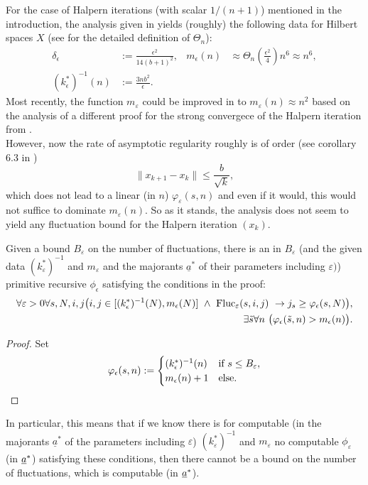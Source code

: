 For the case of Halpern iterations (with scalar $1/(n+1)$) mentioned in 
the introduction, the analysis given in \cite{Kohlenbach/Leustean6}   
yields (roughly) the following data for Hilbert spaces $X$ 
(see \cite{Kohlenbach/Leustean6} for the 
detailed definition of $\Theta_n$):
\begin{align*}
\delta_\epsilon &:= \frac{\epsilon^2}{14(b+1)^2},& m_\epsilon(n)&\approx \Theta_n(\frac{\epsilon^2}{4})n^6\approx n^6,\\
(k^*_\epsilon)^{-1}(n)&:=\frac{3nb^2}{\epsilon}.& 
\end{align*}
Most recently, the function $m_{\varepsilon}$ could be improved in 
\cite{Koernlein} to 
$m_{\varepsilon}(n) \approx n^2$ based on the analysis of a different 
proof for the strong convergece of the Halpern iteration from 
\cite{Xu}.\\
However, now the rate of asymptotic regularity roughly is of order (see 
corollary 6.3 in \cite{Kohlenbach/Leustean6}) 
\[ \| x_{k+1}-x_k\| \le \frac{b}{\sqrt{k}}, \] 
which does not lead to a linear (in $n$) $\varphi_{\varepsilon}(s,n)$ and 
even if it would, this would not suffice to dominate $m_{\varepsilon}(n).$ 
So as it stands, the analysis does not seem to yield any fluctuation 
bound for the Halpern iteration $(x_k).$

\begin{prop}
Given a bound $B_{\varepsilon}$ on the number of fluctuations, there is an in $B_{\varepsilon}$ (and the given data 
$(k^*_{\varepsilon})^{-1}$ and $m_{\varepsilon}$ and the majorants $\underline{a}^*$ of their parameters including $\varepsilon)$) 
primitive recursive $\phi_\epsilon$
satisfying the conditions in the proof:
\begin{align}
\forall \varepsilon >0 \forall s,N,i,j \big( i,j\in[(k^*_\epsilon)^{-1}(N),
m_\epsilon(N)]\ \wedge\ \Fluc_{\varepsilon}(s,i,j)\ 
\rightarrow j_s\geq \phi_\epsilon(s,N) \big),\label{e:FU1}\\
\exists \tilde s\forall n\ \big(\phi_\epsilon(\tilde s,n)>m_\epsilon(n)\big).\label{e:FU2}
\end{align}
\end{prop}
\begin{proof}
Set
\[
\varphi_\epsilon(s,n):=\begin{cases}
(k^*_\epsilon)^{-1}(n)&\text{if}\ s\leq B_{\varepsilon},\\
m_\epsilon(n)+1&\text{else}.
\end{cases}
\]
\end{proof}
\vspace*{-3mm}
\begin{rmk}
In particular, this means that if we know there is for computable 
(in the majorants $\underline{a}^*$ of the parameters including $\varepsilon$) 
$(k^*_{\varepsilon})^{-1}$ and $m_{\varepsilon}$ 
no computable $\phi_{\varepsilon}$ (in $\underline a^*$) satisfying these conditions,
then there cannot be a bound on the number of fluctuations, which is computable (in $\underline a^*$).
\end{rmk}


